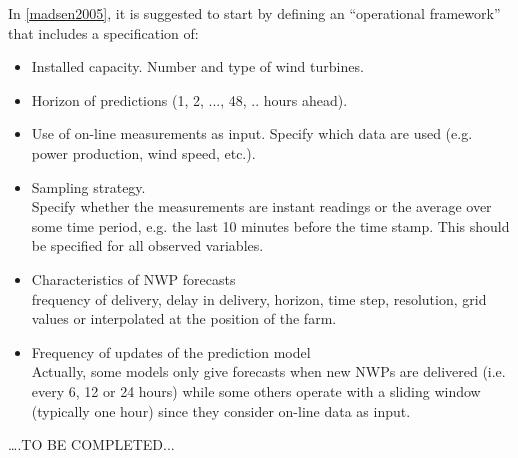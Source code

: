 In \ref{madsen2005}, it is suggested to start by defining an ``operational  framework'' that includes a specification of:
\begin{itemize}
    \item Installed capacity. Number and type of wind turbines.
    \item Horizon of predictions (1, 2, ..., 48, .. hours ahead).
    \item Use  of  on-line  measurements  as  input.  Specify  which  data  are  used  (e.g.  power production, wind speed, etc.).
    \item Sampling  strategy. \\ 
        Specify  whether  the  measurements  are  instant  readings  or  the
    average over some time period, e.g. the last 10 minutes before the time stamp. This
    should be specified for all observed variables.
    \item Characteristics of NWP forecasts \\
        frequency of delivery, delay in delivery, horizon, time step, resolution, grid values or interpolated at the position of the farm.
    \item  Frequency  of  updates  of  the  prediction  model \\
        Actually,  some  models  only  give forecasts  when  new  NWPs  are  delivered  (i.e.  every  6,  12  or  24  hours)  while  some others  operate  with  a  sliding  window  (typically  one  hour)  since  they  consider  on-line data as input.
\end{itemize}



….TO BE COMPLETED...
